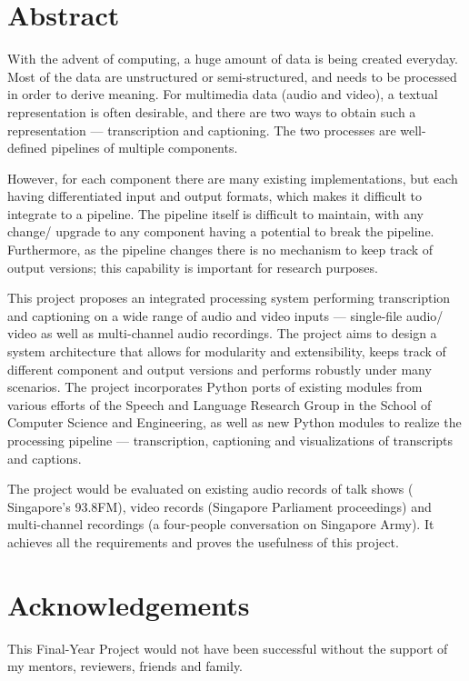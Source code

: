 \chapter*{Abstract}
With the advent of computing, a huge amount of data is being created everyday.
Most of the data are unstructured or semi-structured, and needs to be processed
in order to derive meaning. For multimedia data (audio and video), a textual
representation is often desirable, and there are two ways to obtain such a
representation --- transcription and captioning. The two processes are
well-defined pipelines of multiple components.

However, for each component there are many existing implementations, but each
having differentiated input and output formats, which makes it difficult to
integrate to a pipeline. The pipeline itself is difficult to maintain, with
any change/ upgrade to any component having a potential to break the pipeline.
Furthermore, as the pipeline changes there is no mechanism to keep track of
output versions; this capability is important for research purposes.

This project proposes an integrated processing system performing transcription
and captioning on a wide range of audio and video inputs --- single-file audio/
video as well as multi-channel audio recordings. The project aims to design
a system architecture that allows for modularity and extensibility, keeps track
of different component and output versions and performs robustly under many
scenarios. The project incorporates Python ports of existing modules from various
efforts of the Speech and Language Research Group in the School of Computer
Science and Engineering, as well as new Python modules to realize the processing
pipeline --- transcription, captioning and visualizations of transcripts and
captions.

The project would be evaluated on existing audio records of talk shows (
Singapore's 93.8FM), video records (Singapore Parliament proceedings) and
multi-channel recordings (a four-people conversation on Singapore Army). It
achieves all the requirements and proves the usefulness of this project.

\newpage

\chapter*{Acknowledgements}
This Final-Year Project would not have been successful without the support
of my mentors, reviewers, friends and family.

